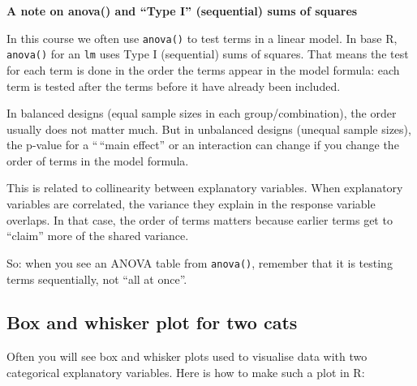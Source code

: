 \documentclass[
  letterpaper,
  8pt,
  a4paper]{book}
\begin{document}
\begin{tcolorbox}[enhanced jigsaw, arc=.35mm, bottomrule=.15mm, bottomtitle=1mm, breakable, colback=white, colbacktitle=quarto-callout-important-color!10!white, colframe=quarto-callout-important-color-frame, coltitle=black, left=2mm, leftrule=.75mm, opacityback=0, opacitybacktitle=0.6, rightrule=.15mm, title=\textcolor{quarto-callout-important-color}{\faExclamation}\hspace{0.5em}{Important}, titlerule=0mm, toprule=.15mm, toptitle=1mm]

\textbf{A note on anova() and ``Type I'' (sequential) sums of squares}

In this course we often use \texttt{anova()} to test terms in a linear
model. In base R, \texttt{anova()} for an \texttt{lm} uses Type I
(sequential) sums of squares. That means the test for each term is done
in the order the terms appear in the model formula: each term is tested
after the terms before it have already been included.

In balanced designs (equal sample sizes in each group/combination), the
order usually does not matter much. But in unbalanced designs (unequal
sample sizes), the p-value for a ``\,``main effect'' or an interaction
can change if you change the order of terms in the model formula.

This is related to collinearity between explanatory variables. When
explanatory variables are correlated, the variance they explain in the
response variable overlaps. In that case, the order of terms matters
because earlier terms get to ``claim'' more of the shared variance.

So: when you see an ANOVA table from \texttt{anova()}, remember that it
is testing terms sequentially, not ``all at once''.

\end{tcolorbox}

\subsection*{Box and whisker plot for two
cats}\label{box-and-whisker-plot-for-two-cats}

Often you will see box and whisker plots used to visualise data with two
categorical explanatory variables. Here is how to make such a plot in R:
\end{document}
